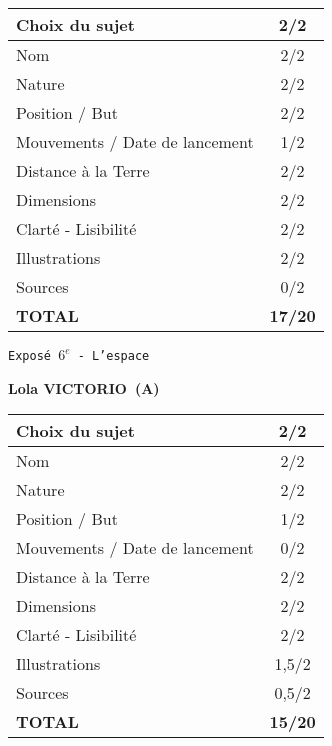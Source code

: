 	\vspace*{2cm}
	\begin{tabular}{|l|c|}
		\hline
		Choix du sujet & 2/2 \\
		\hline
		Nom & 2/2 \\
		\hline
		Nature & 2/2 \\
		\hline
		Position / But & 2/2 \\
		\hline
		Mouvements / Date de lancement & 1/2 \\
		\hline
		Distance \`a la Terre & 2/2 \\
		\hline
		Dimensions & 2/2 \\
		\hline
		Clart\'e - Lisibilit\'e & 2/2 \\
		\hline
		Illustrations & 2/2 \\
		\hline
		Sources & 0/2 \\
		\hline
		\textbf{TOTAL}  & \textbf{17/20} \\
		\hline
	\end{tabular}
	\newline
	\LARGE{\texttt{Expos\'e $6^e$ - L'espace}}
	\vspace*{1cm}

	\textbf{Lola VICTORIO\ (A)}

	\vspace*{2cm}
	\begin{tabular}{|l|c|}
		\hline
		Choix du sujet & 2/2 \\
		\hline
		Nom & 2/2 \\
		\hline
		Nature & 2/2 \\
		\hline
		Position / But & 1/2 \\
		\hline
		Mouvements / Date de lancement & 0/2 \\
		\hline
		Distance \`a la Terre & 2/2 \\
		\hline
		Dimensions & 2/2 \\
		\hline
		Clart\'e - Lisibilit\'e & 2/2 \\
		\hline
		Illustrations & 1,5/2 \\
		\hline
		Sources & 0,5/2 \\
		\hline
		\textbf{TOTAL}  & \textbf{15/20} \\
		\hline
	\end{tabular}
	\newline
